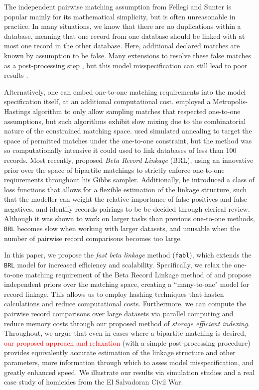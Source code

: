 \documentclass[12pt,letterpaper]{article}
\newcommand{\1}[1]{\mathbb{I}\!\left[#1\right]} %
\begin{document}
{	The independent pairwise matching assumption from Fellegi and Sunter is popular mainly for its mathematical simplicity, but is often unreasonable in practice. In many situations, we know that there are no duplications within a database, meaning that one record from one database should be linked with at most one record in the other database. Here, additional declared matches are known by assumption to be false. Many extensions to \cite{fellegi_theory_1969} resolve these false matches as a post-processing step \citep{jaro1989}, but this model misspecification can still lead to poor results \citep{sadinle_bayesian_2017}.
	
	Alternatively, one can embed one-to-one matching requirements into the model specification itself, at an additional computational cost. \cite{larsen2005} employed a Metropolis-Hastings algorithm to only allow sampling matches that respected one-to-one assumptions, but such algorithms exhibit slow mixing due to the combinatorial nature of the constrained matching space. \cite{fortunato_2010} used simulated annealing to target the space of permitted matches under the one-to-one constraint, but the method was so computationally intensive it could used to link databases of less than 100 records. Most recently, \cite{sadinle_bayesian_2017} proposed \emph{Beta Record Linkage} (BRL), using an innovative prior over the space of bipartite matchings to strictly enforce one-to-one reqiurements throughout his Gibbs sampler. Additionally, he introduced a class of loss functions that allows for a flexible estimation of the linkage structure, such that the modeller can weight the relative importance of false positives and false negatives, and identify records pairings to be be decided through clerical review. Although it was shown to work on larger tasks than previous one-to-one methods, \texttt{BRL} becomes slow when working with larger datasets, and unusable when the number of pairwise record comparisons becomes too large. 
	
	In this paper, we propose the \emph{fast beta linkage} method (\texttt{fabl}), which extends the \texttt{BRL} model for increased efficiency and scalability. Specifically, we relax the one-to-one matching requirement of the Beta Record Linkage method of \citep{sadinle_bayesian_2017} and propose independent priors over the matching space, creating a ``many-to-one" model for record linkage. This allows us to employ hashing techniques that hasten calculations and reduce computational costs. Furthermore, we can compute the pairwise record comparisons over large datasets via parallel computing and reduce memory costs through our proposed method of \emph{storage efficient indexing}. Throughout, we argue that even in cases where a bipartite matching is desired, \textcolor{red}{our proposed approach and relaxation} (with a simple post-processing procedure) provides equivalently accurate estimation of the linkage structure and other parameters, more information through which to asses model misspecification, and greatly enhanced speed. We illustrate our results via simulation studies and a real case study of homicides from the El Salvadoran Civil War. 
	
}
\end{document}
